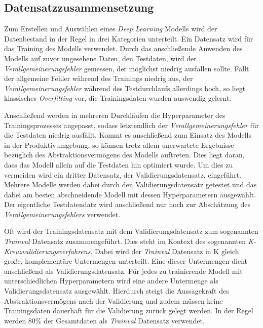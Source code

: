 \subsection{Datensatzzusammensetzung}

Zum Erstellen und Auswählen eines \textit{Deep Learning} Modells wird der Datenbestand in der Regel in drei Kategorien unterteilt. Ein Datensatz wird für das Training des Modells verwendet. Durch das anschließende Anwenden des Modells auf zuvor ungesehene Daten, den Testdaten, wird der \textit{Verallgemeinerungsfehler} gemessen, der möglichst niedrig ausfallen sollte. Fällt der allgemeine Fehler während des Trainings niedrig aus, der \textit{Verallgemeinerungsfehler} während des Testdurchlaufs allerdings hoch, so liegt klassisches \textit{Overfitting} vor, die Trainingsdaten wurden auswendig gelernt. \cite{AurelienGeron.2018}

Anschließend werden in mehreren Durchläufen die Hyperparameter des Trainingsprozesses angepasst, sodass letztendlich der \textit{Verallgemeinerungsfehler} für die Testdaten niedrig ausfällt. Kommt es anschließend zum Einsatz des Modells in der Produktivumgebung, so können trotz allem unerwartete Ergebnisse bezüglich des Abstraktionsvermögens des Modells auftreten. Dies liegt daran, dass das Modell allein auf die Testdaten hin optimiert wurde. Um dies zu vermeiden wird ein dritter Datensatz, der Validierungsdatensatz, eingeführt. Mehrere Modelle werden dabei durch den Validierungsdatensatz getestet und das dabei am besten abschneidende Modell mit dessen Hyperparametern ausgewählt. Der eigentliche Testdatendatz wird anschließend nur noch zur Abschätzung des \textit{Verallgemeinerungsfehlers} verwendet. \cite{AurelienGeron.2018}

Oft wird der Trainingsdatensatz mit dem Validierungsdatensatz zum sogenannten \textit{Trainval} Datensatz zusammengeführt. Dies steht im Kontext des sogenannten \textit{K-Kreuzvalidierungsverfahrens}. Dabei wird der \textit{Trainval} Datensatz in K gleich große, komplementäre Untermengen unterteilt. Eine dieser Untermengen dient anschließend als Validierungsdatensatz. Für jedes zu trainierende Modell mit unterschiedlichen Hyperparametern wird eine andere Untermenge als Validierungsdatensatz ausgewählt. Hierdurch steigt die Aussagekraft des Abstraktionsvermögens nach der Validierung und zudem müssen keine Trainingsdaten dauerhaft für die Validierung zurück gelegt werden. In der Regel werden 80\% der Gesamtdaten als \textit{Trainval} Datensatz verwendet. \cite{AurelienGeron.2018}

